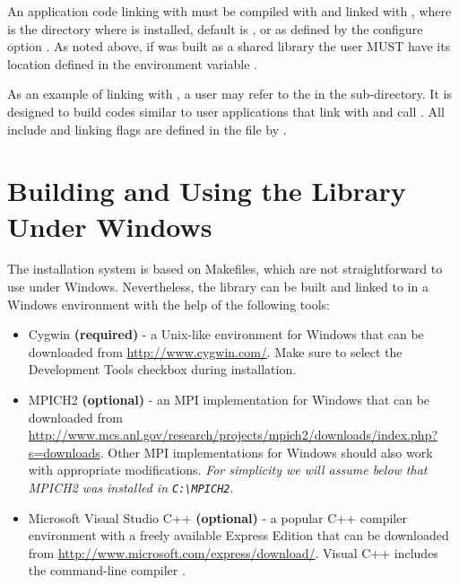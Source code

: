 An application code linking with \hypre{} must be compiled with
 and linked with , where
 is the directory where \hypre{} is installed, default is
, or as defined by the configure option . As
noted above, if \hypre{} was built as a shared library the user MUST have its
location defined in the environment variable .

As an example of linking with \hypre{}, a user may refer to the 
in the  sub-directory.  It is designed to build codes similar to
user applications that link with and call \hypre{}.  All include and linking
flags are defined in the  file by .


\section{Building and Using the Library Under Windows} \label{sec-windows}

The \hypre{} installation system is based on Makefiles, which are not
straightforward to use under Windows. Nevertheless, the library can be built and
linked to in a Windows environment with the help of the following tools:

\begin{itemize}
\item Cygwin {\bf (required)} - a Unix-like environment for Windows that can be
  downloaded from \url{http://www.cygwin.com/}.  Make sure to select the
  Development Tools checkbox during installation.
\item MPICH2 {\bf (optional)} - an MPI implementation for Windows that can be
  downloaded from
  \url{http://www.mcs.anl.gov/research/projects/mpich2/downloads/index.php?s=downloads}.
  Other MPI implementations for Windows should also work with appropriate
  modifications. {\em For simplicity we will assume below that MPICH2 was
  installed in \verb|C:\MPICH2|}.
\item Microsoft Visual Studio C++ {\bf (optional)} - a popular C++ compiler
  environment with a freely available Express Edition that can be downloaded
  from \url{http://www.microsoft.com/express/download/}. Visual C++ includes the
  command-line compiler .
\end{itemize}

